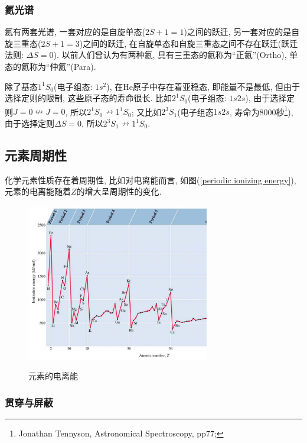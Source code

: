 \subsubsection{氦光谱}

氦有两套光谱, 一套对应的是自旋单态($2S+1=1$)之间的跃迁,
另一套对应的是自旋三重态($2S+1=3$)之间的跃迁,
在自旋单态和自旋三重态之间不存在跃迁(跃迁法则: $\Delta S =0$).
以前人们曾认为有两种氦, 具有三重态的氦称为``正氦''(Ortho),
单态的氦称为``仲氦''(Para).

除了基态$1^1S_0$(电子组态: $1s^2$), 在He原子中存在着亚稳态,
即能量不是最低, 但由于选择定则的限制, 这些原子态的寿命很长.
比如$2^1S_0$(电子组态: $1s2s$), 由于选择定则$J=0 \nleftrightarrow
J=0$, 所以$2^1S_0 \nrightarrow 1^1S_0$;
又比如$2^3S_1$(电子组态$1s2s$, 寿命为8000秒\footnote{Jonathan
Tennyson, Astronomical Spectroscopy, pp77;}), 由于选择定则$\Delta
S=0$, 所以$2^3S_1 \nrightarrow 1^1S_0$.

\subsection{元素周期性}

化学元素性质存在着周期性, 比如对电离能而言, 如图(\ref{periodic
ionizing energy}), 元素的电离能随着$Z$的增大呈周期性的变化.

\begin{figure}[h]
\begin{center}
  \includegraphics[width=8cm]{Spectrum/ionizing_energy.ps}\\
  \caption{元素的电离能}\label{periodic ionizing energy}
\end{center}
\end{figure}


\subsubsection*{贯穿与屏蔽}

